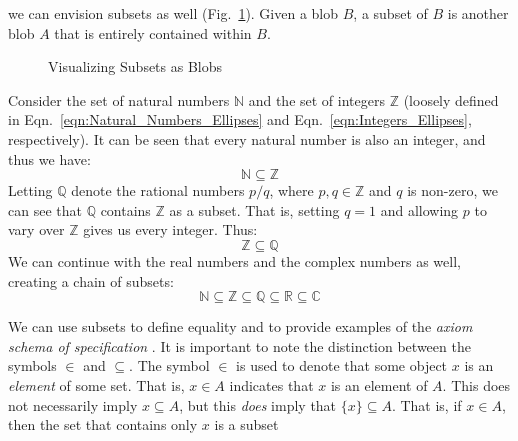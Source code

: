         we can envision subsets as well (Fig.~\ref{fig:Subset_Blobs}). Given a
        blob $B$, a subset of $B$ is another blob $A$ that is entirely contained
        within $B$.
        \begin{figure}[H]
            \centering
            
            \caption{Visualizing Subsets as Blobs}
            \label{fig:Subset_Blobs}
        \end{figure}
        \begin{example}
            Consider the set of natural numbers $\mathbb{N}$ and the set of
            integers $\mathbb{Z}$ (loosely defined in
            Eqn.~\ref{eqn:Natural_Numbers_Ellipses} and
            Eqn.~\ref{eqn:Integers_Ellipses}, respectively). It can be seen that
            every natural number is also an integer, and thus we have:
            \begin{equation}
                \mathbb{N}\subseteq\mathbb{Z}
            \end{equation}
            Letting $\mathbb{Q}$ denote the rational numbers $p/q$, where
            $p,q\in\mathbb{Z}$ and $q$ is non-zero, we can see that $\mathbb{Q}$
            contains $\mathbb{Z}$ as a subset. That is, setting $q=1$ and
            allowing $p$ to vary over $\mathbb{Z}$ gives us every integer. Thus:
            \begin{equation}
                \mathbb{Z}\subseteq\mathbb{Q}
            \end{equation}
            We can continue with the real numbers and the complex numbers as
            well, creating a chain of subsets:
            \begin{equation}
                \mathbb{N}\subseteq\mathbb{Z}\subseteq\mathbb{Q}
                \subseteq\mathbb{R}\subseteq\mathbb{C}
            \end{equation}
        \end{example}
        We can use subsets to define equality and to provide examples
        of the \textit{axiom schema of specification}%
        . It is important to note the
        distinction between the symbols $\in$ and $\subseteq$. The symbol $\in$
        is used to denote that some object $x$ is an \textit{element}%
         of some set. That is, $x\in{A}$ indicates that
        $x$ is an element of $A$. This does not necessarily imply
        $x\subseteq{A}$, but this \textit{does} imply that $\{x\}\subseteq{A}$.
        That is, if $x\in{A}$, then the set that contains only $x$ is a subset

